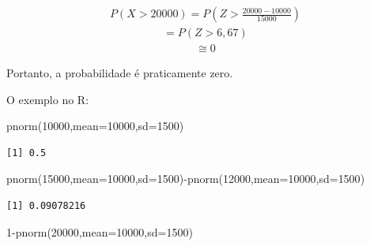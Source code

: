 \documentclass[
  letterpaper,
  DIV=11,
  numbers=noendperiod]{scrartcl}
\newenvironment{Shaded}{\begin{snugshade}}{\end{snugshade}}
\newcommand{\AttributeTok}[1]{\textcolor[rgb]{0.40,0.45,0.13}{#1}}
\newcommand{\DecValTok}[1]{\textcolor[rgb]{0.68,0.00,0.00}{#1}}
\newcommand{\FunctionTok}[1]{\textcolor[rgb]{0.28,0.35,0.67}{#1}}
\newcommand{\NormalTok}[1]{\textcolor[rgb]{0.00,0.23,0.31}{#1}}
\newcommand{\SpecialCharTok}[1]{\textcolor[rgb]{0.37,0.37,0.37}{#1}}
\begin{document}
\begin{exemplo}
\[\begin{array}{ccc}
P(X>20000)=P( Z > \frac{20000-10000}{15000})
\end{array}\] \[\begin{array}{ccc}
= P(Z>6,67)
\end{array}\] \[\begin{array}{ccc}
\cong 0
\end{array}\]

Portanto, a probabilidade é praticamente zero.

\end{exemplo}

\begin{tcolorbox}
O exemplo no R:
\end{tcolorbox}

\begin{Shaded}
\begin{Highlighting}[]
\FunctionTok{pnorm}\NormalTok{(}\DecValTok{10000}\NormalTok{,}\AttributeTok{mean=}\DecValTok{10000}\NormalTok{,}\AttributeTok{sd=}\DecValTok{1500}\NormalTok{)}
\end{Highlighting}
\end{Shaded}

\begin{verbatim}
[1] 0.5
\end{verbatim}

\begin{Shaded}
\begin{Highlighting}[]
\FunctionTok{pnorm}\NormalTok{(}\DecValTok{15000}\NormalTok{,}\AttributeTok{mean=}\DecValTok{10000}\NormalTok{,}\AttributeTok{sd=}\DecValTok{1500}\NormalTok{)}\SpecialCharTok{{-}}\FunctionTok{pnorm}\NormalTok{(}\DecValTok{12000}\NormalTok{,}\AttributeTok{mean=}\DecValTok{10000}\NormalTok{,}\AttributeTok{sd=}\DecValTok{1500}\NormalTok{)}
\end{Highlighting}
\end{Shaded}

\begin{verbatim}
[1] 0.09078216
\end{verbatim}

\begin{Shaded}
\begin{Highlighting}[]
\DecValTok{1}\SpecialCharTok{{-}}\FunctionTok{pnorm}\NormalTok{(}\DecValTok{20000}\NormalTok{,}\AttributeTok{mean=}\DecValTok{10000}\NormalTok{,}\AttributeTok{sd=}\DecValTok{1500}\NormalTok{)}
\end{Highlighting}
\end{Shaded}
\end{document}
